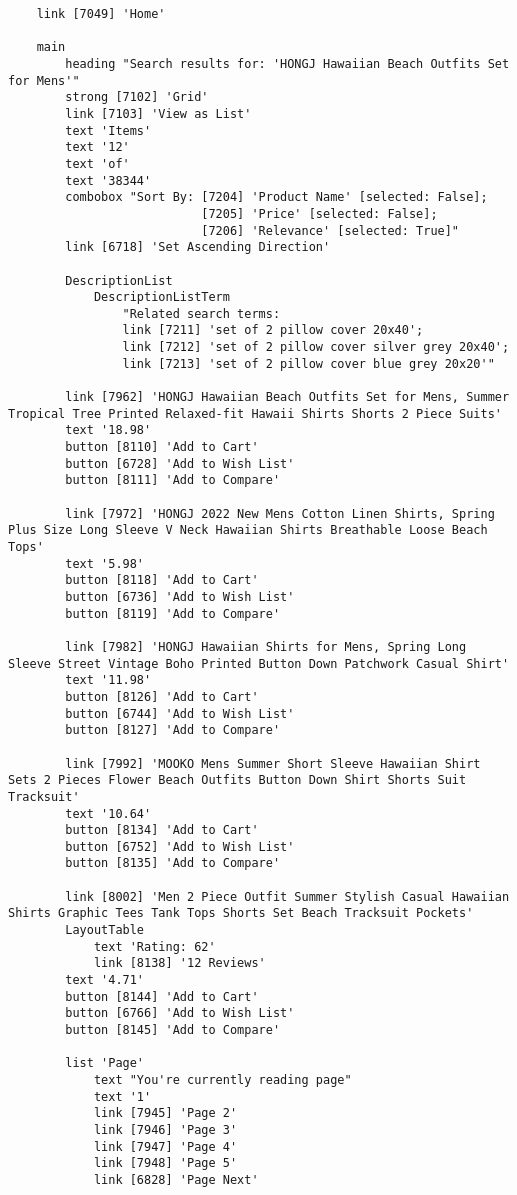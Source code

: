 \begin{tcolorbox}[breakable]
\begin{lstlisting}
    link [7049] 'Home'
    
    main
        heading "Search results for: 'HONGJ Hawaiian Beach Outfits Set for Mens'"
        strong [7102] 'Grid'
        link [7103] 'View as List'
        text 'Items'
        text '12'
        text 'of'
        text '38344'
        combobox "Sort By: [7204] 'Product Name' [selected: False]; 
                           [7205] 'Price' [selected: False]; 
                           [7206] 'Relevance' [selected: True]"
        link [6718] 'Set Ascending Direction'

        DescriptionList
            DescriptionListTerm 
                "Related search terms: 
                link [7211] 'set of 2 pillow cover 20x40'; 
                link [7212] 'set of 2 pillow cover silver grey 20x40'; 
                link [7213] 'set of 2 pillow cover blue grey 20x20'"

        link [7962] 'HONGJ Hawaiian Beach Outfits Set for Mens, Summer Tropical Tree Printed Relaxed-fit Hawaii Shirts Shorts 2 Piece Suits'
        text '18.98'
        button [8110] 'Add to Cart'
        button [6728] 'Add to Wish List'
        button [8111] 'Add to Compare'

        link [7972] 'HONGJ 2022 New Mens Cotton Linen Shirts, Spring Plus Size Long Sleeve V Neck Hawaiian Shirts Breathable Loose Beach Tops'
        text '5.98'
        button [8118] 'Add to Cart'
        button [6736] 'Add to Wish List'
        button [8119] 'Add to Compare'

        link [7982] 'HONGJ Hawaiian Shirts for Mens, Spring Long Sleeve Street Vintage Boho Printed Button Down Patchwork Casual Shirt'
        text '11.98'
        button [8126] 'Add to Cart'
        button [6744] 'Add to Wish List'
        button [8127] 'Add to Compare'

        link [7992] 'MOOKO Mens Summer Short Sleeve Hawaiian Shirt Sets 2 Pieces Flower Beach Outfits Button Down Shirt Shorts Suit Tracksuit'
        text '10.64'
        button [8134] 'Add to Cart'
        button [6752] 'Add to Wish List'
        button [8135] 'Add to Compare'

        link [8002] 'Men 2 Piece Outfit Summer Stylish Casual Hawaiian Shirts Graphic Tees Tank Tops Shorts Set Beach Tracksuit Pockets'
        LayoutTable
            text 'Rating: 62'
            link [8138] '12 Reviews'
        text '4.71'
        button [8144] 'Add to Cart'
        button [6766] 'Add to Wish List'
        button [8145] 'Add to Compare'

        list 'Page'
            text "You're currently reading page"
            text '1'
            link [7945] 'Page 2'
            link [7946] 'Page 3'
            link [7947] 'Page 4'
            link [7948] 'Page 5'
            link [6828] 'Page Next'


\end{lstlisting}
\end{tcolorbox}
